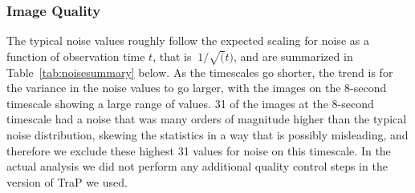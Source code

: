 \documentclass[12pt]{article}
\begin{document}
\subsubsection{Image Quality}

The typical noise values roughly follow the expected scaling for noise as a function of observation time $t$, that is $~1/\sqrt(t)$, and are summarized in Table~\ref{tab:noisesummary} below. As the timescales go shorter, the trend is for the variance in the noise values to go larger, with the images on the 8-second timescale showing a large range of values. 31 of the images at the 8-second timescale had a noise that was many orders of magnitude higher than the typical noise distribution, skewing the statistics in a way that is possibly misleading, and therefore we exclude these highest 31 values for noise on this timescale. In the actual analysis we did not perform any additional quality control steps in the version of TraP we used. 
\end{document}
